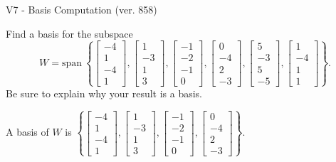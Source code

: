 \begin{exercise}
  \begin{exerciseTitle}V7 - Basis Computation (ver. 858)\end{exerciseTitle}
  \begin{exerciseStatement}
    Find a basis for the subspace 
\[W=\mathrm{span}\ \left\{\left[\begin{array}{r}
-4 \\
1 \\
-4 \\
1
\end{array}\right] , \left[\begin{array}{r}
1 \\
-3 \\
1 \\
3
\end{array}\right] , \left[\begin{array}{r}
-1 \\
-2 \\
-1 \\
0
\end{array}\right] , \left[\begin{array}{r}
0 \\
-4 \\
2 \\
-3
\end{array}\right] , \left[\begin{array}{r}
5 \\
-3 \\
5 \\
-5
\end{array}\right] , \left[\begin{array}{r}
1 \\
-4 \\
1 \\
1
\end{array}\right]\right\}.\]
 Be sure to explain why your result is a basis.


  \end{exerciseStatement}
  \begin{exerciseAnswer}
   A basis of \(W\) is  \(\left\{\left[\begin{array}{r}
-4 \\
1 \\
-4 \\
1
\end{array}\right] , \left[\begin{array}{r}
1 \\
-3 \\
1 \\
3
\end{array}\right] , \left[\begin{array}{r}
-1 \\
-2 \\
-1 \\
0
\end{array}\right] , \left[\begin{array}{r}
0 \\
-4 \\
2 \\
-3
\end{array}\right]\right\}\).
  


  \end{exerciseAnswer}
\end{exercise}